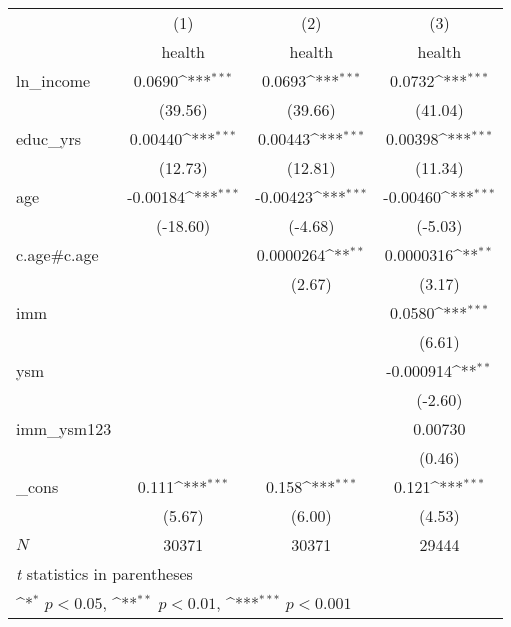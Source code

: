 {
\def\sym#1{\ifmmode^{#1}\else\(^{#1}\)\fi}
\begin{tabular}{l*{3}{c}}
\hline\hline
            &\multicolumn{1}{c}{(1)}&\multicolumn{1}{c}{(2)}&\multicolumn{1}{c}{(3)}\\
            &\multicolumn{1}{c}{health}&\multicolumn{1}{c}{health}&\multicolumn{1}{c}{health}\\
\hline
ln\_income   &      0.0690\sym{***}&      0.0693\sym{***}&      0.0732\sym{***}\\
            &     (39.56)         &     (39.66)         &     (41.04)         \\
[1em]
educ\_yrs    &     0.00440\sym{***}&     0.00443\sym{***}&     0.00398\sym{***}\\
            &     (12.73)         &     (12.81)         &     (11.34)         \\
[1em]
age         &    -0.00184\sym{***}&    -0.00423\sym{***}&    -0.00460\sym{***}\\
            &    (-18.60)         &     (-4.68)         &     (-5.03)         \\
[1em]
c.age#c.age &                     &   0.0000264\sym{**} &   0.0000316\sym{**} \\
            &                     &      (2.67)         &      (3.17)         \\
[1em]
imm         &                     &                     &      0.0580\sym{***}\\
            &                     &                     &      (6.61)         \\
[1em]
ysm         &                     &                     &   -0.000914\sym{**} \\
            &                     &                     &     (-2.60)         \\
[1em]
imm\_ysm123  &                     &                     &     0.00730         \\
            &                     &                     &      (0.46)         \\
[1em]
\_cons      &       0.111\sym{***}&       0.158\sym{***}&       0.121\sym{***}\\
            &      (5.67)         &      (6.00)         &      (4.53)         \\
\hline
\(N\)       &       30371         &       30371         &       29444         \\
\hline\hline
\multicolumn{4}{l}{\footnotesize \textit{t} statistics in parentheses}\\
\multicolumn{4}{l}{\footnotesize \sym{*} \(p<0.05\), \sym{**} \(p<0.01\), \sym{***} \(p<0.001\)}\\
\end{tabular}
}
